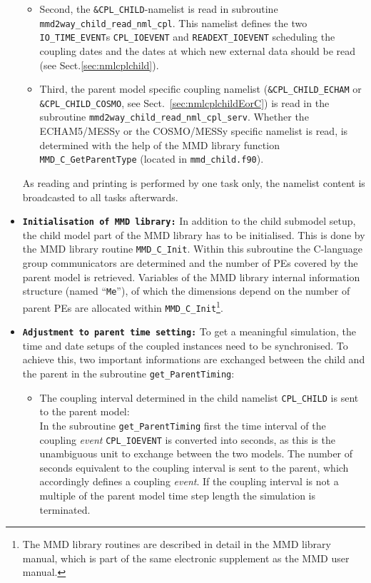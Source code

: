 \documentclass[11pt,twoside]{article}
\begin{document}
\begin{itemize}
\begin{itemize}
\item Second, the \verb|&CPL_CHILD|-namelist is read in subroutine 
\verb|mmd2way_child_read_nml_cpl|. This namelist defines the
two \verb|IO_TIME_EVENT|s  \verb|CPL_IOEVENT|
and \verb|READEXT_IOEVENT|  scheduling the coupling dates and the
dates at which new external data should be read (see
Sect.\ref{sec:nmlcplchild}). 

\item  Third, the parent model specific coupling
 namelist (\verb|&CPL_CHILD_ECHAM| or \verb|&CPL_CHILD_COSMO|, see
 Sect.\ \ref{sec:nmlcplchildEorC}) is read in the
 subroutine \verb|mmd2way_child_read_nml_cpl_serv|.  
Whether the ECHAM5/MESSy or the COSMO/MESSy specific namelist is read, is 
determined with the help of the MMD library function \verb|MMD_C_GetParentType| 
(located in \verb|mmd_child.f90|).
\end{itemize}
As reading and printing is performed by one task only, the namelist
content is broadcasted to all tasks afterwards.

\item {\tt \bf  Initialisation of MMD library:}
In addition to the child submodel setup, the child model part of the MMD
library  has to be initialised. This is done by the MMD library routine 
\verb|MMD_C_Init|. 
Within this subroutine the C-language group communicators are
determined and the number of PEs covered by the parent model
is retrieved. Variables of the MMD library internal information structure
 (named ``\verb|Me|''), of which the dimensions depend on the number of
 parent PEs are  allocated within 
\verb|MMD_C_Init|\footnote{The MMD library routines are described in detail
in the MMD library manual, which is part of the same electronic
supplement as the MMD user manual.}.

\item {\tt \bf Adjustment to parent time setting:}
To get a meaningful simulation, the time and date setups of the
coupled instances need to be  
synchronised. To achieve this, two important informations are
exchanged between the child and the parent in the
subroutine \verb|get_ParentTiming|: 
\begin{itemize}
\item[1.)] The coupling interval determined in the child
namelist \verb|CPL_CHILD| is sent to the parent model:\\
In the subroutine \verb|get_ParentTiming| first the time interval
of the coupling {\it event} \verb|CPL_IOEVENT| is converted into seconds, as 
this is 
the unambiguous unit to exchange between the two models. The number of 
seconds equivalent to the coupling interval is sent to the parent, which 
accordingly defines a coupling {\it event}. If the coupling interval is not a 
multiple of the parent model time step length the simulation is terminated. 


\end{itemize}
\end{itemize}
\end{document}

